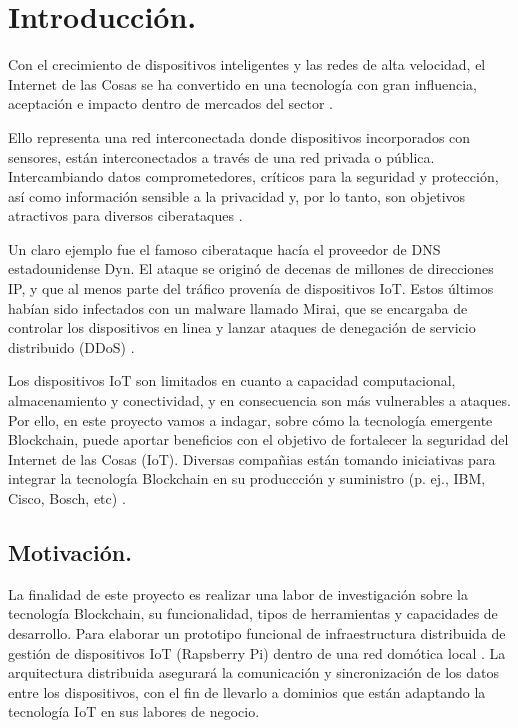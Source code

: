 \section{Introducción.}

Con el crecimiento de dispositivos inteligentes y las redes de alta velocidad, el Internet de las Cosas se ha convertido
en una tecnología con gran influencia, aceptación e impacto dentro de mercados del sector \cite{khan2018iot}. 

\vspace{5mm}

\noindent Ello representa una red interconectada donde dispositivos incorporados con sensores, están interconectados a 
través de una red privada o pública. Intercambiando datos comprometedores, críticos para la seguridad y protección, así 
como información sensible a la privacidad y, por lo tanto, son objetivos atractivos para diversos ciberataques 
\cite{dorri2017blockchain}. 

\vspace{5mm}

\noindent Un claro ejemplo fue el famoso ciberataque hacía el proveedor de DNS estadounidense Dyn. El ataque se originó 
de decenas de millones de direcciones IP, y que al menos parte del tráfico provenía de dispositivos IoT. Estos últimos 
habían sido infectados con un malware llamado Mirai, que se encargaba de controlar los dispositivos en linea y lanzar 
ataques de denegación de servicio distribuido (DDoS) \cite{kshetri2017can}. 

\vspace{5mm}

\noindent Los dispositivos IoT son limitados en cuanto a capacidad computacional, almacenamiento y conectividad, y en 
consecuencia son más vulnerables a ataques. Por ello, en este proyecto vamos a indagar, sobre cómo la tecnología 
emergente Blockchain, puede aportar beneficios con el objetivo de fortalecer la seguridad del Internet de las Cosas 
(IoT). Diversas compañias están tomando iniciativas para integrar la tecnología Blockchain en su produccción y 
suministro (p. ej., IBM, Cisco, Bosch, etc) \cite{kshetri2017can}.   

\subsection{Motivación.} \label{motivacion}

La finalidad de este proyecto es realizar una labor de investigación sobre la tecnología Blockchain, su funcionalidad, 
tipos de herramientas y capacidades de desarrollo. Para elaborar un prototipo funcional de infraestructura distribuida 
de gestión de dispositivos IoT (Rapsberry Pi) dentro de una red domótica local \cite{huh2017managing}. La arquitectura 
distribuida asegurará la comunicación y sincronización de los datos entre los dispositivos, con el fin de llevarlo a 
dominios que están adaptando la tecnología IoT en sus labores de negocio.

